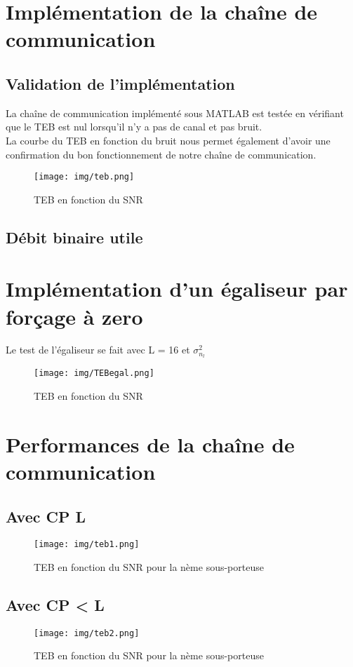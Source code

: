 \documentclass[11pt]{article}
\begin{document}
	\section{Implémentation de la chaîne de communication}
	
	\subsection{Validation de l'implémentation}

	La chaîne de communication implémenté sous MATLAB est testée en vérifiant que le TEB est nul lorsqu'il n'y a pas de canal et pas bruit.\\
	La courbe du TEB en fonction du bruit nous permet également d'avoir une confirmation du bon fonctionnement de notre chaîne de communication.

		\begin{figure}[h]
			\centering
			\texttt{[image: img/teb.png]}
			\caption{TEB en fonction du SNR}
			\label{teb}
		\end{figure}

	\subsection{Débit binaire utile}
	
		
	
	\section{Implémentation d'un égaliseur par forçage à zero}
	
	Le test de l'égaliseur se fait avec L = 16 et $\sigma_{n_l}^2$
		
		\begin{figure}[h]
			\centering
			\texttt{[image: img/TEBegal.png]}
			\caption{TEB en fonction du SNR}
			\label{egal}
		\end{figure}
	
	\section{Performances de la chaîne de communication}
	
		\subsection{Avec CP \geq L}
		
		\begin{figure}[h]
			\centering
			\texttt{[image: img/teb1.png]}
			\caption{TEB en fonction du SNR pour la nème sous-porteuse}
			\label{teb1}
		\end{figure}
		
		\subsection{Avec CP < L}

		\begin{figure}[h]
			\centering
			\texttt{[image: img/teb2.png]}
			\caption{TEB en fonction du SNR pour la nème sous-porteuse}
			\label{teb2}
		\end{figure}
\end{document}

